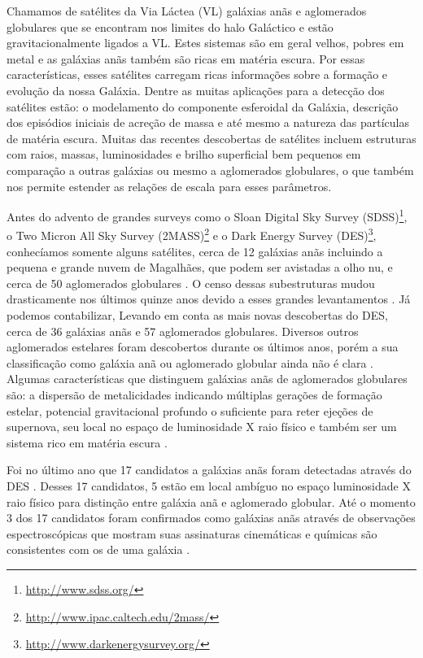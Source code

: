 \documentclass[
	12pt,				%
	openany,			%
	oneside,			%
	a4paper,			%
	english,			%
	brazil				%
	]{abntex2}
\begin{document}
\qquad Chamamos de  satélites da Via Láctea (VL) galáxias anãs e aglomerados globulares que se encontram nos limites do halo Galáctico e estão gravitacionalmente ligados a VL. Estes sistemas são em geral velhos, pobres em metal e as galáxias anãs também são ricas em matéria escura. Por essas características, esses satélites carregam ricas informações sobre a formação e evolução da nossa Galáxia. Dentre as muitas aplicações para a detecção dos satélites estão: o modelamento do componente esferoidal da Galáxia, descrição dos episódios iniciais de acreção de massa e até mesmo a natureza das partículas de matéria escura. Muitas das recentes descobertas de satélites incluem estruturas com raios, massas, luminosidades e brilho superficial bem pequenos em comparação a outras galáxias ou mesmo a aglomerados globulares, o que também nos permite estender as relações de escala para esses parâmetros. \par
\qquad Antes do advento de grandes surveys como o Sloan Digital Sky Survey (SDSS)\footnote{\url{http://www.sdss.org/}}, o Two Micron All Sky Survey (2MASS)\footnote{\url{http://www.ipac.caltech.edu/2mass/}} e o Dark Energy Survey (DES)\footnote{\url{http://www.darkenergysurvey.org/}},  conhecíamos somente alguns satélites, cerca de 12 galáxias anãs \cite{2012AJ....144....4M} incluindo a pequena e grande nuvem de Magalhães, que podem ser avistadas a olho nu, e cerca de 50 aglomerados globulares \cite{1996AJ....112.1487H}. O censo dessas subestruturas mudou drasticamente nos últimos quinze anos devido a esses grandes levantamentos \cite{2005astro.ph..6460W,2006AAS...20917805Z,2010ApJ...712L.103B,2007MNRAS.382..515V} . Já podemos contabilizar, Levando em conta as mais novas descobertas do DES, cerca de 36 galáxias anãs e 57 aglomerados globulares. Diversos outros aglomerados estelares foram descobertos durante os últimos anos, porém a sua classificação como galáxia anã ou aglomerado globular ainda não é clara \cite{2010ApJ...712L.103B,2013ApJ...767..101B,2005AJ....129.2692W,2015ApJ...804L..44K,2015ApJ...803...63K}.  Algumas características que distinguem  galáxias anãs de aglomerados globulares são:  a dispersão de metalicidades indicando múltiplas gerações de formação estelar, potencial gravitacional profundo o suficiente para reter ejeções de supernova, seu local no espaço de luminosidade X raio físico e também ser um sistema rico em matéria escura \cite{2012AJ....144...76W}. \par
Foi no último ano que 17 candidatos a galáxias anãs foram detectadas através do DES \cite{2015ApJ...807...50B,2015arXiv150803622T}. Desses 17 candidatos, 5 estão em local ambíguo  no espaço luminosidade X raio físico para distinção entre galáxia anã e aglomerado globular. Até o momento 3 dos 17 candidatos foram confirmados como galáxias anãs  através de observações espectroscópicas que mostram suas assinaturas cinemáticas e químicas são consistentes com os de uma galáxia \cite{2015ApJ...811...62K,2015ApJ...810...56K}.  
\end{document}
